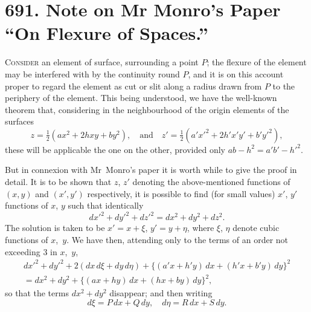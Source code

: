 \documentclass[11pt,a4paper]{book}
\begin{document}
\vfill



\newpage

\section*{691. Note on Mr Monro's Paper ``On Flexure of Spaces.''}
\label{paper:691}


\bigskip

\textsc{Consider} an element of surface, surrounding a point $P$; the flexure of the element may be interfered with by the continuity round $P$, and it is on this account proper to regard the element as cut or slit along a radius drawn from $P$ to the periphery of the element. This being understood, we have the well-known theorem that, considering in the neighbourhood of the origin elements of the surfaces
\[
z = \tfrac{1}{2}(ax^2 + 2hxy + by^2),
\quad\text{and}\quad
z' = \tfrac{1}{2}(a'x'^2 + 2h'x'y' + b'y'^2),
\]
these will be applicable the one on the other, provided only $ab - h^2 = a'b' - h'^2$.

But in connexion with Mr~Monro's paper it is worth while to give the proof in detail. It is to be shown that $z$, $z'$ denoting the above-mentioned functions of $(x, y)$ and $(x', y')$ respectively, it is possible to find (for small values) $x'$, $y'$ functions of $x$, $y$ such that identically
\[
dx'^2 + dy'^2 + dz'^2 = dx^2 + dy^2 + dz^2.
\]
The solution is taken to be $x' = x + \xi$, $y' = y + \eta$, where $\xi$, $\eta$ denote cubic functions of $x$,~$y$. We have then, attending only to the terms of an order not exceeding 3 in $x$,~$y$,
\begin{multline*}
dx'^2 + dy'^2 + 2(dx\,d\xi + dy\,d\eta) + \{(a'x + h'y)\,dx + (h'x + b'y)\,dy\}^2 \\
= dx^2 + dy^2 + \{(ax + hy)\,dx + (hx + by)\,dy\}^2,
\end{multline*}
so that the terms $dx^2 + dy^2$ disappear; and then writing
\[
d\xi = P\,dx + Q\,dy,\quad d\eta = R\,dx + S\,dy.
\]
\end{document}
